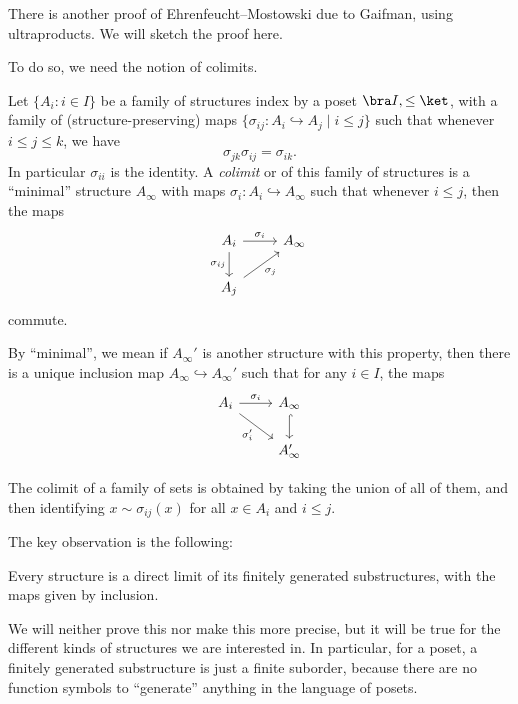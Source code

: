 \documentclass[a4paper]{article}
\begin{document}
There is another proof of Ehrenfeucht--Mostowski due to Gaifman, using ultraproducts. We will sketch the proof here.

To do so, we need the notion of colimits.
\begin{defi}[Colimit]
  Let $\{A_i: i \in I\}$ be a family of structures index by a poset $\bra I, \leq\ket$, with a family of (structure-preserving) maps $\{\sigma_{ij}: A_i \hookrightarrow A_j \mid i \leq j\}$ such that whenever $i \leq j \leq k$, we have
  \[
    \sigma_{jk} \sigma_{ij} = \sigma_{ik}.
  \]
  In particular $\sigma_{ii}$ is the identity. A \emph{colimit} or  of this family of structures is a ``minimal'' structure $A_\infty$ with maps $\sigma_i: A_i \hookrightarrow A_\infty$ such that whenever $i \leq j$, then the maps
  \[
    \begin{tikzcd}
      A_i \ar[d, "\sigma_{ij}"'] \ar[r, "\sigma_i"] & A_\infty\\
      A_j \ar[ur, "\sigma_j"']
    \end{tikzcd}
  \]
  commute.

  By ``minimal'', we mean if $A_\infty'$ is another structure with this property, then there is a unique inclusion map $A_\infty \hookrightarrow A_\infty'$ such that for any $i \in I$, the maps
  \[
    \begin{tikzcd}
      A_i \ar[r, "\sigma_i"] \ar[rd, "\sigma_i'"'] & A_\infty\ar[d, hook]\\
      & A_\infty'
    \end{tikzcd}
  \]
\end{defi}

\begin{eg}
  The colimit of a family of sets is obtained by taking the union of all of them, and then identifying $x \sim \sigma_{ij}(x)$ for all $x \in A_i$ and $i \leq j$.
\end{eg}

The key observation is the following:
\begin{significant}
  Every structure is a direct limit of its finitely generated substructures, with the maps given by inclusion.
\end{significant}
We will neither prove this nor make this more precise, but it will be true for the different kinds of structures we are interested in. In particular, for a poset, a finitely generated substructure is just a finite suborder, because there are no function symbols to ``generate'' anything in the language of posets.
\end{document}
